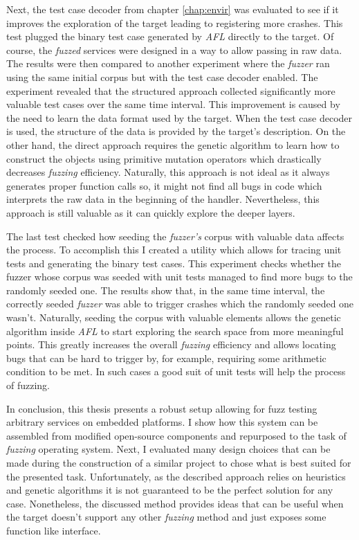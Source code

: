 Next, the test case decoder from chapter \ref{chap:envir} was evaluated to see if it improves the exploration of the target leading to registering more crashes. This test plugged the binary test case generated by \textit{AFL} directly to the target. Of course, the \textit{fuzzed} services were designed in a way to allow passing in raw data. The results were then compared to another experiment where the \textit{fuzzer} ran using the same initial corpus but with the test case decoder enabled. The experiment revealed that the structured approach collected significantly more valuable test cases over the same time interval. This improvement is caused by the need to learn the data format used by the target. When the test case decoder is used, the structure of the data is provided by the target's description. On the other hand, the direct approach requires the genetic algorithm to learn how to construct the objects using primitive mutation operators which drastically decreases \textit{fuzzing} efficiency. Naturally, this approach is not ideal as it always generates proper function calls so, it might not find all bugs in code which interprets the raw data in the beginning of the handler. Nevertheless, this approach is still valuable as it can quickly explore the deeper layers.

The last test checked how seeding the \textit{fuzzer's} corpus with valuable data affects the process. To accomplish this I created a utility which allows for tracing unit tests and generating the binary test cases. This experiment checks whether the fuzzer whose corpus was seeded with unit tests managed to find more bugs to the randomly seeded one. The results show that, in the same time interval, the correctly seeded \textit{fuzzer} was able to trigger crashes which the randomly seeded one wasn't. Naturally, seeding the corpus with valuable elements allows the genetic algorithm inside \textit{AFL} to start exploring the search space from more meaningful points. This greatly increases the overall \textit{fuzzing} efficiency and allows locating bugs that can be hard to trigger by, for example, requiring some arithmetic condition to be met. In such cases a good suit of unit tests will help the process of fuzzing.

In conclusion, this thesis presents a robust setup allowing for fuzz testing arbitrary services on embedded platforms. I show how this system can be assembled from modified open-source components and repurposed to the task of \textit{fuzzing} operating system. Next, I evaluated many design choices that can be made during the construction of a similar project to chose what is best suited for the presented task. Unfortunately, as the described approach relies on heuristics and genetic algorithms it is not guaranteed to be the perfect solution for any case. Nonetheless, the discussed method provides ideas that can be useful when the target doesn't support any other \textit{fuzzing} method and just exposes some function like interface.